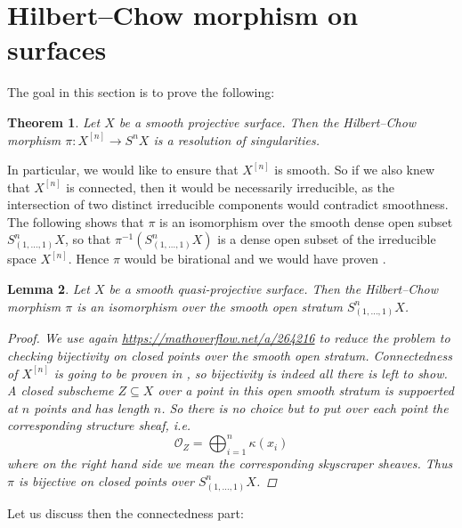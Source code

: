 \documentclass[12pt,a4paper]{amsart}
\theoremstyle{plain}
\newtheorem{thm}{Theorem}[section]
\newtheorem{lm}[thm]{Lemma}
\theoremstyle{definition}
\theoremstyle{remark}
\begin{document}
\section{Hilbert--Chow morphism on surfaces}

The goal in this section is to prove the following:

\begin{thm}\label{thm:resolution}
  Let $X$ be a smooth projective surface.
  Then the Hilbert--Chow morphism $\pi \colon X^{[n]} \to S^{n}X$ is a resolution of singularities.
\end{thm}

In particular, we would like to ensure that $X^{[n]}$ is smooth.
So if we also knew that $X^{[n]}$ is connected, then it would be necessarily irreducible, as the intersection of two distinct irreducible components would contradict smoothness.
The following  shows that $\pi$ is an isomorphism over the smooth dense open subset $S^{n}_{(1,\ldots,1)}X$, so that $\pi^{-1}(S^{n}_{(1, \ldots, 1)}X)$ is a dense open subset of the irreducible space $X^{[n]}$.
Hence $\pi$ would be birational and we would have proven .

\begin{lm}\label{lm:overstratum}
  Let $X$ be a smooth quasi-projective surface.
  Then the Hilbert--Chow morphism $\pi$ is an isomorphism over the smooth open stratum $S^{n}_{(1,\ldots,1)}X$.
  \begin{proof}
    We use again \url{https://mathoverflow.net/a/264216} to reduce the problem to checking bijectivity on closed points over the smooth open stratum.
    Connectedness of $X^{[n]}$ is going to be proven in , so bijectivity is indeed all there is left to show.
    A closed subscheme $Z \subseteq X$ over a point in this open smooth stratum is suppoerted at $n$ points and has length $n$.
    So there is no choice but to put over each point the corresponding structure sheaf, i.e.
    \[ \mathscr{O}_{Z} = \bigoplus_{i = 1}^{n} \kappa(x_{i}) \]
    where on the right hand side we mean the corresponding skyscraper sheaves.
    Thus $\pi$ is bijective on closed points over $S^{n}_{(1, \ldots, 1)}X$.
  \end{proof}
\end{lm}

Let us discuss then the connectedness part:
\end{document}

